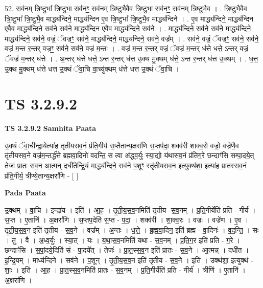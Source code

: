 \documentclass[17pt]{extarticle}
\begin{document}
52. सव॑नम् त्रि॒ष्टुभा᳚ त्रि॒ष्टुभा॒ सव॑नꣳ॒॒ सव॑नम् त्रि॒ष्टुभै॒वैव त्रि॒ष्टुभा॒ सव॑नꣳ॒॒ सव॑नम् त्रि॒ष्टुभै॒व । . त्रि॒ष्टुभै॒वैव त्रि॒ष्टुभा᳚ त्रि॒ष्टुभै॒व माद्ध्य॑न्दिने॒ माद्ध्य॑न्दिन ए॒व त्रि॒ष्टुभा᳚ त्रि॒ष्टुभै॒व माद्ध्य॑न्दिने । . ए॒व माद्ध्य॑न्दिने॒ माद्ध्य॑न्दिन ए॒वैव माद्ध्य॑न्दिने॒ सव॑ने॒ सव॑ने॒ माद्ध्य॑न्दिन ए॒वैव माद्ध्य॑न्दिने॒ सव॑ने । . माद्ध्य॑न्दिने॒ सव॑ने॒ सव॑ने॒ माद्ध्य॑न्दिने॒ माद्ध्य॑न्दिने॒ सव॑ने॒ वज्रं॒ ॅवज्रꣳ॒॒ सव॑ने॒ माद्ध्य॑न्दिने॒ माद्ध्य॑न्दिने॒ सव॑ने॒ वज्र᳚म् । . सव॑ने॒ वज्रं॒ ॅवज्रꣳ॒॒ सव॑ने॒ सव॑ने॒ वज्र॑ म॒न्त र॒न्तर् वज्रꣳ॒॒ सव॑ने॒ सव॑ने॒ वज्र॑ म॒न्तः । . वज्र॑ म॒न्त र॒न्तर् वज्रं॒ ॅवज्र॑ म॒न्तर् ध॑त्ते धत्ते॒ ऽन्तर् वज्रं॒ ॅवज्र॑ म॒न्तर् ध॑त्ते । . अ॒न्तर् ध॑त्ते धत्ते॒ ऽन्त र॒न्तर् ध॑त्त उ॒क्थ मु॒क्थम् ध॑त्ते॒ ऽन्त र॒न्तर् ध॑त्त उ॒क्थम् । . ध॒त्त॒ उ॒क्थ मु॒क्थम् ध॑त्ते धत्त उ॒क्थं ॅवा॒चि वा॒च्यु॑क्थम् ध॑त्ते धत्त उ॒क्थं ॅवा॒चि । \newline
\pagebreak
{}

\section{ TS 3.2.9.2 }

\textbf{TS 3.2.9.2 } \newline
\textbf{Samhita Paata} \newline

उ॒क्थं ॅवा॒चीन्द्रा॒येत्या॑ह तृतीयसव॒नं प्र॑ति॒गीर्य॑ स॒प्तैतान्य॒क्षरा॑णि स॒प्तप॑दा॒ शक्व॑री शाक्व॒रो वज्रो॒ वज्रे॑णै॒व तृ॑तीयसव॒ने वज्र॑म॒न्तर्द्ध॑त्ते ब्रह्मवा॒दिनो॑ वदन्ति॒ स त्वा अ॑द्ध्व॒र्युः स्या॒द्यो य॑थासव॒नं प्र॑तिग॒रे छन्दाꣳ॑सि सम्पा॒दये॒त् तेजः॑ प्रातः सव॒न आ॒त्मन् दधी॑तेन्द्रि॒यं माद्ध्य॑न्दिने॒ सव॑ने प॒शूꣳ स्तृ॑तीयसव॒न इत्युक्थ॑शा॒ इत्या॑ह प्रातस्सव॒नं प्र॑ति॒गीर्य॒ त्रीण्ये॒तान्य॒क्षरा॑णि - [  ] \newline

\textbf{Pada Paata} \newline

उ॒क्थम् । वा॒चि । इन्द्रा॑य । इति॑ । आ॒ह॒ । तृ॒ती॒य॒स॒व॒नमिति॑ तृतीय -स॒व॒नम् । प्र॒ति॒गीर्येति॑ प्रति - गीर्य॑ । स॒प्त । ए॒तानि॑ । अ॒क्षरा॑णि । स॒प्तप॒देति॑ स॒प्त - प॒दा॒ । शक्व॑री । शा॒क्व॒रः । वज्रः॑ । वज्रे॑ण । ए॒व । तृ॒ती॒य॒स॒व॒न इति॑ तृतीय - स॒व॒ने । वज्र᳚म् । अ॒न्तः । ध॒त्ते॒ । ब्र॒ह्म॒वा॒दिन॒ इति॑ ब्रह्म - वा॒दिनः॑ । व॒द॒न्ति॒ । सः । तु । वै । अ॒ध्व॒र्युः । स्या॒त् । यः । य॒था॒स॒व॒नमिति॑ यथा - स॒व॒नम् । प्र॒ति॒ग॒र इति॑ प्रति - ग॒रे । छन्दाꣳ॑सि । स॒पां॒दये॒दिति॑ सं - पा॒दये᳚त् । तेजः॑ । प्रा॒त॒स्स॒व॒न इति॑ प्रातः - स॒व॒ने । आ॒त्मन्न् । दधी॑त । इ॒न्द्रि॒यम् । माध्य॑न्दिने । सव॑ने । प॒शून् । तृ॒ती॒य॒स॒व॒न इति॑ तृतीय - स॒व॒ने । इति॑ । उक्थ॑शा॒ इत्युक्थ॑ - शाः॒ । इति॑ । आ॒ह॒ । प्रा॒त॒स्स॒व॒नमिति॑ प्रातः - स॒व॒नम् । प्र॒ति॒गीर्येति॑ प्रति - गीर्य॑ । त्रीणि॑ । ए॒तानि॑ । अ॒क्षरा॑णि ।  \newline
\end{document}
